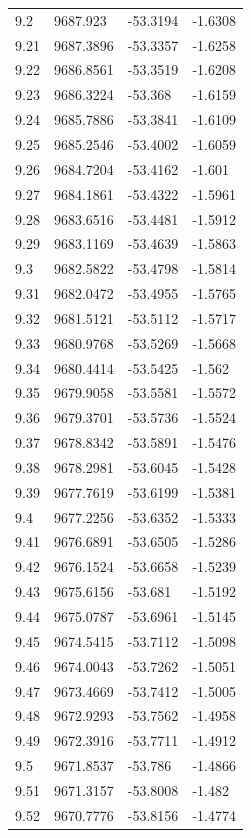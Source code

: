 \begin{table}[H]
\begin{tabular}{llll}
9.2 & 9687.923 & -53.3194 & -1.6308 \\
9.21 & 9687.3896 & -53.3357 & -1.6258 \\
9.22 & 9686.8561 & -53.3519 & -1.6208 \\
9.23 & 9686.3224 & -53.368 & -1.6159 \\
9.24 & 9685.7886 & -53.3841 & -1.6109 \\
9.25 & 9685.2546 & -53.4002 & -1.6059 \\
9.26 & 9684.7204 & -53.4162 & -1.601 \\
9.27 & 9684.1861 & -53.4322 & -1.5961 \\
9.28 & 9683.6516 & -53.4481 & -1.5912 \\
9.29 & 9683.1169 & -53.4639 & -1.5863 \\
9.3 & 9682.5822 & -53.4798 & -1.5814 \\
9.31 & 9682.0472 & -53.4955 & -1.5765 \\
9.32 & 9681.5121 & -53.5112 & -1.5717 \\
9.33 & 9680.9768 & -53.5269 & -1.5668 \\
9.34 & 9680.4414 & -53.5425 & -1.562 \\
9.35 & 9679.9058 & -53.5581 & -1.5572 \\
9.36 & 9679.3701 & -53.5736 & -1.5524 \\
9.37 & 9678.8342 & -53.5891 & -1.5476 \\
9.38 & 9678.2981 & -53.6045 & -1.5428 \\
9.39 & 9677.7619 & -53.6199 & -1.5381 \\
9.4 & 9677.2256 & -53.6352 & -1.5333 \\
9.41 & 9676.6891 & -53.6505 & -1.5286 \\
9.42 & 9676.1524 & -53.6658 & -1.5239 \\
9.43 & 9675.6156 & -53.681 & -1.5192 \\
9.44 & 9675.0787 & -53.6961 & -1.5145 \\
9.45 & 9674.5415 & -53.7112 & -1.5098 \\
9.46 & 9674.0043 & -53.7262 & -1.5051 \\
9.47 & 9673.4669 & -53.7412 & -1.5005 \\
9.48 & 9672.9293 & -53.7562 & -1.4958 \\
9.49 & 9672.3916 & -53.7711 & -1.4912 \\
9.5 & 9671.8537 & -53.786 & -1.4866 \\
9.51 & 9671.3157 & -53.8008 & -1.482 \\
9.52 & 9670.7776 & -53.8156 & -1.4774 \\

\end{tabular}
\end{table}
